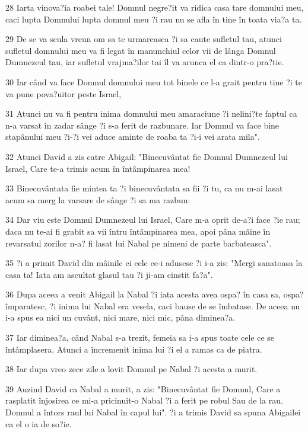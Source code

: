 \par 28 Iarta vinova?ia roabei tale! Domnul negre?it va ridica casa tare domnului meu, caci lupta Domnului lupta domnul meu ?i rau nu se afla în tine în toata via?a ta.
\par 29 De se va scula vreun om sa te urmareasca ?i sa caute sufletul tau, atunci sufletul domnului meu va fi legat în manunchiul celor vii de lânga Domnul Dumnezeul tau, iar sufletul vrajma?ilor tai îl va arunca el ca dintr-o pra?tie.
\par 30 Iar când va face Domnul domnului meu tot binele ce l-a grait pentru tine ?i te va pune pova?uitor peste Israel,
\par 31 Atunci nu va fi pentru inima domnului meu amaraciune ?i nelini?te faptul ca n-a varsat în zadar sânge ?i s-a ferit de razbunare. Iar Domnul va face bine stapânului meu ?i-?i vei aduce aminte de roaba ta ?i-i vei arata mila".
\par 32 Atunci David a zis catre Abigail: "Binecuvântat fie Domnul Dumnezeul lui Israel, Care te-a trimis acum în întâmpinarea mea!
\par 33 Binecuvântata fie mintea ta ?i binecuvântata sa fii ?i tu, ca nu m-ai lasat acum sa merg la varsare de sânge ?i sa ma razbun:
\par 34 Dar viu este Domnul Dumnezeul lui Israel, Care m-a oprit de-a?i face ?ie rau; daca nu te-ai fi grabit sa vii întru întâmpinarea mea, apoi pâna mâine în revarsatul zorilor n-a? fi lasat lui Nabal pe nimeni de parte barbateasca".
\par 35 ?i a primit David din mâinile ei cele ce-i adusese ?i i-a zis: "Mergi sanatoasa la casa ta! Iata am ascultat glasul tau ?i ji-am cinstit fa?a".
\par 36 Dupa aceea a venit Abigail la Nabal ?i iata acesta avea ospa? în casa sa, ospa? împaratesc, ?i inima lui Nabal era vesela, caci bause de se îmbatase. De aceea nu i-a spus ea nici un cuvânt, nici mare, nici mic, pâna diminea?a.
\par 37 Iar diminea?a, când Nabal s-a trezit, femeia sa i-a spus toate cele ce se întâmplasera. Atunci a încremenit inima lui ?i el a ramas ca de piatra.
\par 38 Iar dupa vreo zece zile a lovit Domnul pe Nabal ?i acesta a murit.
\par 39 Auzind David ca Nabal a murit, a zis: "Binecuvântat fie Domnul, Care a rasplatit înjosirea ce mi-a pricinuit-o Nabal ?i a ferit pe robul Sau de la rau. Domnul a întors raul lui Nabal în capul lui". ?i a trimis David sa spuna Abigailei ca el o ia de so?ie.
